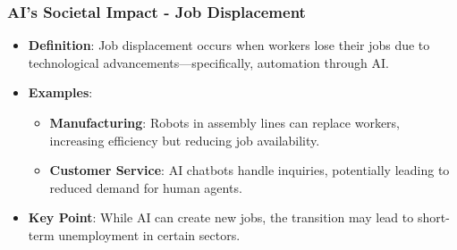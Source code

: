 \documentclass{beamer}
\begin{document}
\begin{frame}[fragile]
    \frametitle{AI's Societal Impact - Job Displacement}
    \begin{itemize}
        \item \textbf{Definition}: Job displacement occurs when workers lose their jobs due to technological advancements—specifically, automation through AI.
        \item \textbf{Examples}:
            \begin{itemize}
                \item \textbf{Manufacturing}: Robots in assembly lines can replace workers, increasing efficiency but reducing job availability.
                \item \textbf{Customer Service}: AI chatbots handle inquiries, potentially leading to reduced demand for human agents.
            \end{itemize}
        \item \textbf{Key Point}: While AI can create new jobs, the transition may lead to short-term unemployment in certain sectors.
    \end{itemize}
\end{frame}
\end{document}

